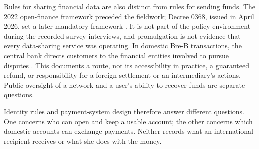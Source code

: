 Rules for sharing financial data are also distinct from rules for sending funds. The 2022 open-finance framework preceded the fieldwork; Decree 0368, issued in April 2026, set a later mandatory framework \citep{decree1297,decree0368}. It is not part of the policy environment during the recorded survey interviews, and promulgation is not evidence that every data-sharing service was operating. In domestic Bre-B transactions, the central bank directs customers to the financial entities involved to pursue disputes \citep{banrepfaq}. This documents a route, not its accessibility in practice, a guaranteed refund, or responsibility for a foreign settlement or an intermediary's actions. Public oversight of a network and a user's ability to recover funds are separate questions.

Identity rules and payment-system design therefore answer different questions. One concerns who can open and keep a usable account; the other concerns which domestic accounts can exchange payments. Neither records what an international recipient receives or what she does with the money.
